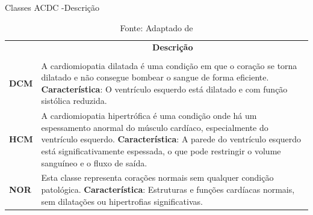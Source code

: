 \begin{table}[H]
    \centering
    \caption{Classes ACDC -Descrição}
    \renewcommand{\arraystretch}{1} %
    \begin{tabular}{|>{\centering\arraybackslash}p{2cm}|p{12cm}|}
    \hline 
          \multicolumn{1}{|c|}{\textbf{Condição}} & \multicolumn{1}{c|}{\textbf{Descrição}} \\
          & \\
    \hline 
        \textbf{DCM} &
        A cardiomiopatia dilatada é uma condição em que o coração se 
        torna dilatado e não consegue bombear o sangue de forma
        eficiente. 
        \newline \newline
        \textbf{Característica}: O ventrículo esquerdo está dilatado e com função sistólica reduzida. \\ 
    \hline
        \textbf{HCM} & 
        A cardiomiopatia hipertrófica é uma condição onde há um espessamento anormal do músculo cardíaco, especialmente do ventrículo esquerdo. 
        \newline \newline
        \textbf{Característica}: A parede do ventrículo esquerdo está significativamente espessada, o que pode restringir o volume sanguíneo e o fluxo de saída. \\ 
    \hline
        \textbf{NOR} & 
        Esta classe representa corações normais sem qualquer condição patológica. 
        \newline \newline
        \textbf{Característica}: Estruturas e funções cardíacas normais, sem dilatações ou hipertrofias significativas. \\ 
    \hline
    \end{tabular} 
    \caption*{Fonte: Adaptado de \cite{bernardDeepLearningTechniques2018a}}
    \label{tab:conditions}
\end{table}


